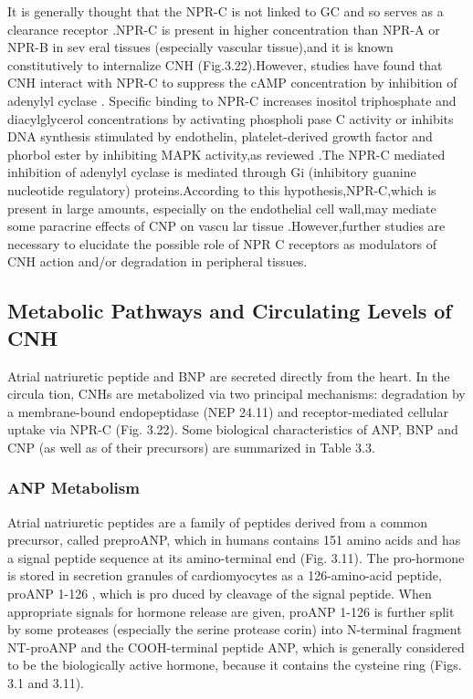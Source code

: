 \documentclass[14pt,a4paper,onecolumn]{extarticle}
\begin{document}
It is generally thought that the NPR-C is not linked to GC and so serves as a clearance receptor \citep{28} \citep{77} \citep{78}.NPR-C is present in higher concentration than NPR-A or NPR-B in sev eral tissues (especially vascular tissue),and it is known constitutively to internalize CNH \citep{172} (Fig.3.22).However, studies have found that CNH interact with NPR-C to suppress the cAMP concentration by inhibition of adenylyl cyclase \citep{190} \citep{191}. Specific binding to NPR-C increases inositol triphosphate and diacylglycerol concentrations by activating phospholi pase C activity or inhibits DNA synthesis stimulated by endothelin, platelet-derived growth factor and phorbol ester by inhibiting MAPK activity,as  reviewed \citep{190}.The NPR-C mediated inhibition of adenylyl cyclase is mediated through Gi (inhibitory guanine nucleotide regulatory) proteins.According to this hypothesis,NPR-C,which is present in large amounts, especially on the endothelial cell wall,may mediate some paracrine effects of CNP on vascu lar tissue \citep{168} \citep{190}.However,further studies are necessary to elucidate the possible role of NPR C receptors as modulators of CNH action and/or degradation in peripheral tissues.

\subsection{Metabolic Pathways and Circulating Levels of CNH}
Atrial natriuretic peptide and BNP are secreted directly from the heart. In the circula tion, CNHs are metabolized via two principal mechanisms: degradation by a membrane-bound endopeptidase (NEP 24.11) and receptor-mediated cellular uptake via NPR-C \citep{14} (Fig. 3.22). Some biological characteristics of ANP, BNP and CNP (as well as of their precursors) are summarized in Table 3.3.

\subsubsection{ANP Metabolism}
Atrial natriuretic peptides are a family of peptides derived from a common precursor, called preproANP, which in humans contains 151 amino acids and has a signal peptide sequence at its amino-terminal end (Fig. 3.11). The pro-hormone is stored in secretion granules of cardiomyocytes as a 126-amino-acid peptide, proANP 1-126 , which is pro duced by cleavage of the signal peptide. When appropriate signals for hormone release are given, proANP 1-126 is further split by some proteases (especially the serine protease corin) \citep{192} into N-terminal fragment NT-proANP and the COOH-terminal peptide ANP, which is generally considered to be the biologically active hormone, because it contains the cysteine ring (Figs. 3.1 and 3.11).
\end{document}
